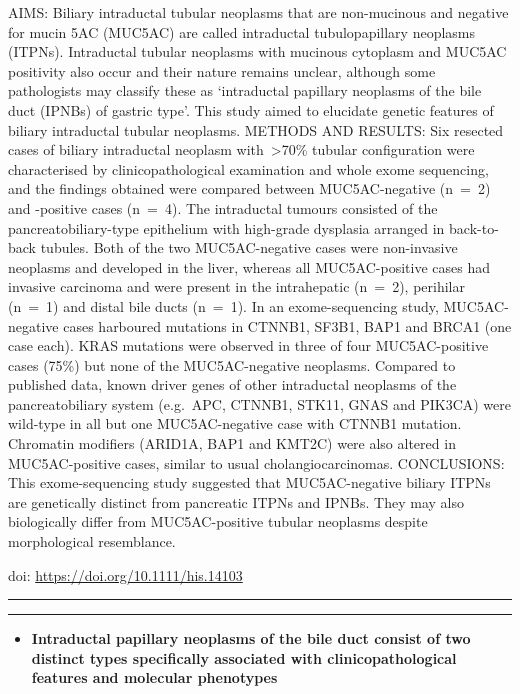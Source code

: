 \documentclass[
]{article}
\providecommand{\tightlist}{%
  \setlength{\itemsep}{0pt}\setlength{\parskip}{0pt}}
\begin{document}
AIMS: Biliary intraductal tubular neoplasms that are non-mucinous and
negative for mucin 5AC (MUC5AC) are called intraductal tubulopapillary
neoplasms (ITPNs). Intraductal tubular neoplasms with mucinous cytoplasm
and MUC5AC positivity also occur and their nature remains unclear,
although some pathologists may classify these as `intraductal papillary
neoplasms of the bile duct (IPNBs) of gastric type'. This study aimed to
elucidate genetic features of biliary intraductal tubular neoplasms.
METHODS AND RESULTS: Six resected cases of biliary intraductal neoplasm
with~\textgreater70\% tubular configuration were characterised by
clinicopathological examination and whole exome sequencing, and the
findings obtained were compared between MUC5AC-negative (n~=~2) and
-positive cases (n~=~4). The intraductal tumours consisted of the
pancreatobiliary-type epithelium with high-grade dysplasia arranged in
back-to-back tubules. Both of the two MUC5AC-negative cases were
non-invasive neoplasms and developed in the liver, whereas all
MUC5AC-positive cases had invasive carcinoma and were present in the
intrahepatic (n~=~2), perihilar (n~=~1) and distal bile ducts (n~=~1).
In an exome-sequencing study, MUC5AC-negative cases harboured mutations
in CTNNB1, SF3B1, BAP1 and BRCA1 (one case each). KRAS mutations were
observed in three of four MUC5AC-positive cases (75\%) but none of the
MUC5AC-negative neoplasms. Compared to published data, known driver
genes of other intraductal neoplasms of the pancreatobiliary system
(e.g.~APC, CTNNB1, STK11, GNAS and PIK3CA) were wild-type in all but one
MUC5AC-negative case with CTNNB1 mutation. Chromatin modifiers (ARID1A,
BAP1 and KMT2C) were also altered in MUC5AC-positive cases, similar to
usual cholangiocarcinomas. CONCLUSIONS: This exome-sequencing study
suggested that MUC5AC-negative biliary ITPNs are genetically distinct
from pancreatic ITPNs and IPNBs. They may also biologically differ from
MUC5AC-positive tubular neoplasms despite morphological resemblance.

doi: \url{https://doi.org/10.1111/his.14103}

\begin{center}\rule{0.5\linewidth}{0.5pt}\end{center}

\begin{center}\rule{0.5\linewidth}{0.5pt}\end{center}

\begin{itemize}
\tightlist
\item
  \textbf{Intraductal papillary neoplasms of the bile duct consist of
  two distinct types specifically associated with clinicopathological
  features and molecular phenotypes}
\end{itemize}
\end{document}
